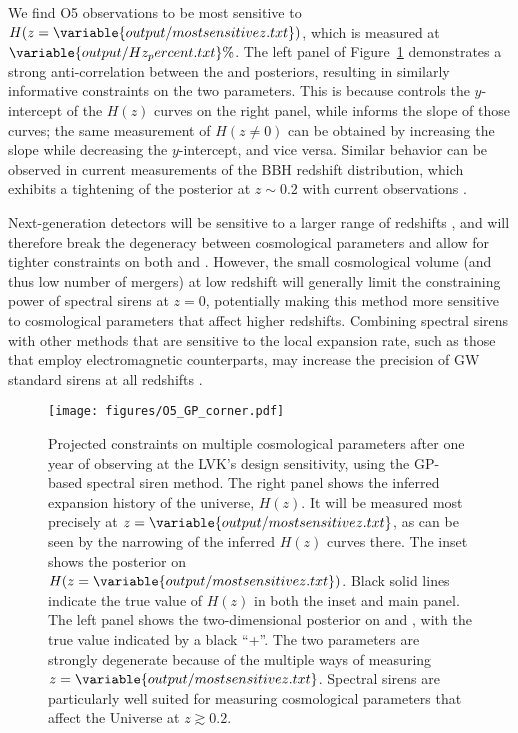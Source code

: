 \documentclass[preprint2,linenumbers]{aastex631}
\begin{document}
We find \ac{O5} observations to be most sensitive to $H(z=\variable{output/mostsensitivez.txt})$, which is measured at $\variable{output/Hz_percent.txt}\%$.
The left panel of Figure~\ref{fig:O5_corner} demonstrates a strong anti-correlation between the \Omm{} and \Ho{} posteriors, resulting in similarly informative constraints on the two parameters.
This is because \Ho{} controls the $y$-intercept of the $H(z)$ curves on the right panel, while \Omm{} informs the slope of those curves; the same measurement of $H(z\neq0)$ can be obtained by increasing the slope while decreasing the $y$-intercept, and vice versa.
Similar behavior can be observed in current measurements of the \ac{BBH} redshift distribution, which exhibits a tightening of the posterior at $z\sim0.2$ with current observations \citep{abbott_population_2023, callister_parameter-free_2023}.

Next-generation detectors will be sensitive to a larger range of redshifts \citep{et_steering_committee_einstein_2020, evans_horizon_2021}, and will therefore break the degeneracy between cosmological parameters and allow for tighter constraints on both \Omm{} and \Ho{}.
However, the small cosmological volume (and thus low number of mergers) at low redshift will generally limit the constraining power of spectral sirens at $z=0$, potentially making this method more sensitive to cosmological parameters that affect higher redshifts. %
Combining spectral sirens with other methods that are sensitive to the local expansion rate, such as those that employ electromagnetic counterparts, may increase the precision of \ac{GW} standard sirens at all redshifts \citep[e.g.][]{Chen:2024gdn}.

\begin{figure*}
    \centering
    \texttt{[image: figures/O5\_GP\_corner.pdf]}
    \caption{
    Projected constraints on multiple cosmological parameters after one year of observing at the \ac{LVK}'s design sensitivity, using the \acl{GP}-based spectral siren method.
    The right panel shows the inferred expansion history of the universe, $H(z)$.
    It will be measured most precisely at $z=\variable{output/mostsensitivez.txt}$, as can be seen by the narrowing of the inferred $H(z)$ curves there.
    The inset shows the posterior on $H(z=\variable{output/mostsensitivez.txt})$.
    Black solid lines indicate the true value of $H(z)$ in both the inset and main panel.
    The left panel shows the two-dimensional posterior on \Ho{} and \Omm, with the true value indicated by a black ``+''.
    The two parameters are strongly degenerate because of the multiple ways of measuring $z=\variable{output/mostsensitivez.txt}$.
    Spectral sirens are particularly well suited for measuring cosmological parameters that affect the Universe at $z\gtrsim0.2$. 
    }
    \label{fig:O5_corner}
\end{figure*}
\end{document}
